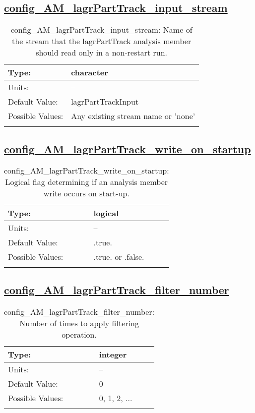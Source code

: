 \subsection[config\_AM\_lagrPartTrack\_input\_stream]{\hyperref[sec:nm_tab_AM_lagrPartTrack]{config\_AM\_lagrPartTrack\_input\_stream}}
\label{subsec:nm_sec_config_AM_lagrPartTrack_input_stream}
\begin{center}
\begin{longtable}{| p{2.0in} || p{4.0in} |}
    \hline
    Type: & character \\
    \hline
    Units: & -- \\
    \hline
    Default Value: & lagrPartTrackInput \\
    \hline
    Possible Values: & Any existing stream name or 'none' \\
    \hline
    \caption{config\_AM\_lagrPartTrack\_input\_stream: Name of the stream that the lagrPartTrack analysis member should read only in a non-restart run.}
\end{longtable}
\end{center}
\subsection[config\_AM\_lagrPartTrack\_write\_on\_startup]{\hyperref[sec:nm_tab_AM_lagrPartTrack]{config\_AM\_lagrPartTrack\_write\_on\_startup}}
\label{subsec:nm_sec_config_AM_lagrPartTrack_write_on_startup}
\begin{center}
\begin{longtable}{| p{2.0in} || p{4.0in} |}
    \hline
    Type: & logical \\
    \hline
    Units: & -- \\
    \hline
    Default Value: & .true. \\
    \hline
    Possible Values: & .true. or .false. \\
    \hline
    \caption{config\_AM\_lagrPartTrack\_write\_on\_startup: Logical flag determining if an analysis member write occurs on start-up.}
\end{longtable}
\end{center}
\subsection[config\_AM\_lagrPartTrack\_filter\_number]{\hyperref[sec:nm_tab_AM_lagrPartTrack]{config\_AM\_lagrPartTrack\_filter\_number}}
\label{subsec:nm_sec_config_AM_lagrPartTrack_filter_number}
\begin{center}
\begin{longtable}{| p{2.0in} || p{4.0in} |}
    \hline
    Type: & integer \\
    \hline
    Units: & -- \\
    \hline
    Default Value: & 0 \\
    \hline
    Possible Values: & 0, 1, 2, ... \\
    \hline
    \caption{config\_AM\_lagrPartTrack\_filter\_number: Number of times to apply filtering operation.}
\end{longtable}
\end{center}

